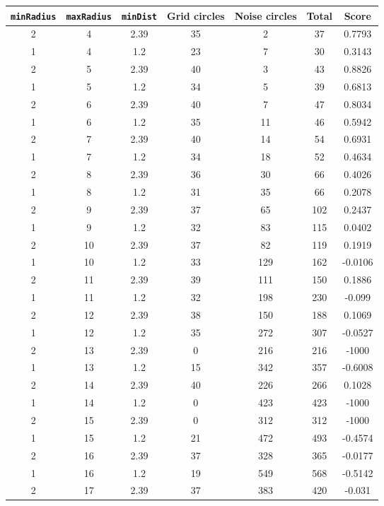 \documentclass[letterpaper, 12pt]{article}
\begin{document}
\begin{longtable}{|c|c|c|c|c|c|c|}
\hline
\textbf{\texttt{minRadius}} & \textbf{\texttt{maxRadius}} & \textbf{\texttt{minDist}} & \textbf{Grid circles} & \textbf{Noise circles} & \textbf{Total} & \textbf{Score} \\
\hline
2 & 4 & 2.39 & 35 & 2 & 37 & 0.7793 \\
\hline
1 & 4 & 1.2 & 23 & 7 & 30 & 0.3143 \\
\hline
2 & 5 & 2.39 & 40 & 3 & 43 & 0.8826 \\
\hline
1 & 5 & 1.2 & 34 & 5 & 39 & 0.6813 \\
\hline
2 & 6 & 2.39 & 40 & 7 & 47 & 0.8034 \\
\hline
1 & 6 & 1.2 & 35 & 11 & 46 & 0.5942 \\
\hline
2 & 7 & 2.39 & 40 & 14 & 54 & 0.6931 \\
\hline
1 & 7 & 1.2 & 34 & 18 & 52 & 0.4634 \\
\hline
2 & 8 & 2.39 & 36 & 30 & 66 & 0.4026 \\
\hline
1 & 8 & 1.2 & 31 & 35 & 66 & 0.2078 \\
\hline
2 & 9 & 2.39 & 37 & 65 & 102 & 0.2437 \\
\hline
1 & 9 & 1.2 & 32 & 83 & 115 & 0.0402 \\
\hline
2 & 10 & 2.39 & 37 & 82 & 119 & 0.1919 \\
\hline
1 & 10 & 1.2 & 33 & 129 & 162 & -0.0106 \\
\hline
2 & 11 & 2.39 & 39 & 111 & 150 & 0.1886 \\
\hline
1 & 11 & 1.2 & 32 & 198 & 230 & -0.099 \\
\hline
2 & 12 & 2.39 & 38 & 150 & 188 & 0.1069 \\
\hline
1 & 12 & 1.2 & 35 & 272 & 307 & -0.0527 \\
\hline
2 & 13 & 2.39 & 0 & 216 & 216 & -1000 \\
\hline
1 & 13 & 1.2 & 15 & 342 & 357 & -0.6008 \\
\hline
2 & 14 & 2.39 & 40 & 226 & 266 & 0.1028 \\
\hline
1 & 14 & 1.2 & 0 & 423 & 423 & -1000 \\
\hline
2 & 15 & 2.39 & 0 & 312 & 312 & -1000 \\
\hline
1 & 15 & 1.2 & 21 & 472 & 493 & -0.4574 \\
\hline
2 & 16 & 2.39 & 37 & 328 & 365 & -0.0177 \\
\hline
1 & 16 & 1.2 & 19 & 549 & 568 & -0.5142 \\
\hline
2 & 17 & 2.39 & 37 & 383 & 420 & -0.031 \\

\end{longtable}
\end{document}

